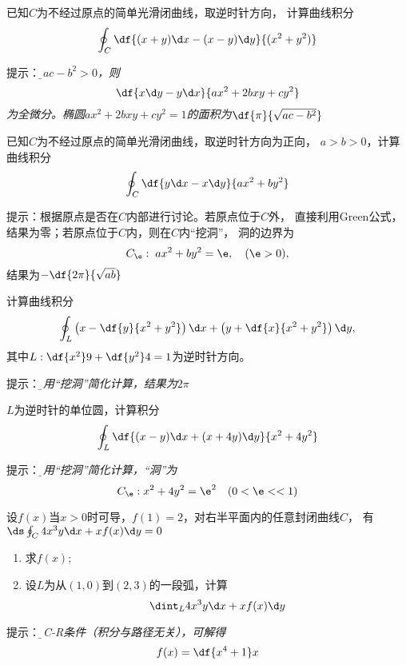 \begin{frame}
	\linespread{1.2}
	已知$C$为不经过原点的简单光滑闭曲线，取逆时针方向，
	计算曲线积分
	$$\oint_C\df{(x+y)\d x-(x-y)\d y}{(x^2+y^2)}$$
	
	\bigskip\pause
	\alert{提示：}{\it\b 若$ac-b^2>0$，则
	$$\df{x\d y-y\d x}{ax^2+2bxy+cy^2}$$
	为全微分。椭圆$ax^2+2bxy+cy^2=1$的面积为$\df{\pi}{\sqrt{ac-b^2}}$
	}
\end{frame}

\begin{frame}
	\linespread{1.2}
	已知$C$为不经过原点的简单光滑闭曲线，取逆时针方向为正向，
	$a>b>0$，计算曲线积分
	$$\oint_C\df{y\d x-x\d y}{ax^2+by^2}$$
	
	\bigskip\pause
	\alert{提示：}{根据原点是否在$C$内部进行讨论。若原点位于$C$外，
	直接利用Green公式，结果为零；若原点位于$C$内，则在$C$内“挖洞”，
	洞的边界为
	$$C_{\e}:\;ax^2+by^2=\e,\quad(\e>0),$$
	结果为$-\df{2\pi}{\sqrt{ab}}$
	}
\end{frame}

\begin{frame}
	\linespread{1.2}
	计算曲线积分
	$$\oint_L\left(x-\df{y}{x^2+y^2}\right)\d x
	+\left(y+\df{x}{x^2+y^2}\right)\d y,$$
	其中$L:\df{x^2}9+\df{y^2}4=1$为逆时针方向。
	
	\bigskip\pause
	\alert{提示：}{\it\b 利用“挖洞”简化计算，结果为$2\pi$}
\end{frame}

\begin{frame}
	\linespread{1.2}
	$L$为逆时针的单位圆，计算积分
	$$\oint_L\df{(x-y)\d x+(x+4y)\d y}
	{x^2+4y^2}$$
	
	\bigskip\pause
	\alert{提示：}{\it\b 利用“挖洞”简化计算，“洞”为
	$$C_{\e}:x^2+4y^2=\e^2\quad(0<\e<<1)$$
	}
\end{frame}

\begin{frame}
	\linespread{1.2}
	设$f(x)$当$x>0$时可导，$f(1)=2$，对右半平面内的任意封闭曲线$C$，
	有$\ds\oint_C4x^3y\d x+xf(x)\d y=0$
	\begin{enumerate}[(1)]
	  \item 求$f(x)$;
	  \item 设$L$为从$(1,0)$到$(2,3)$的一段弧，计算
	  $$\dint_L4x^3y\d x+xf(x)\d y$$
	\end{enumerate}
		
	\bigskip\pause
	\alert{提示：}{\it\b 
	由C-R条件（积分与路径无关），可解得$$f(x)=\df{x^4+1}x$$}
\end{frame}

